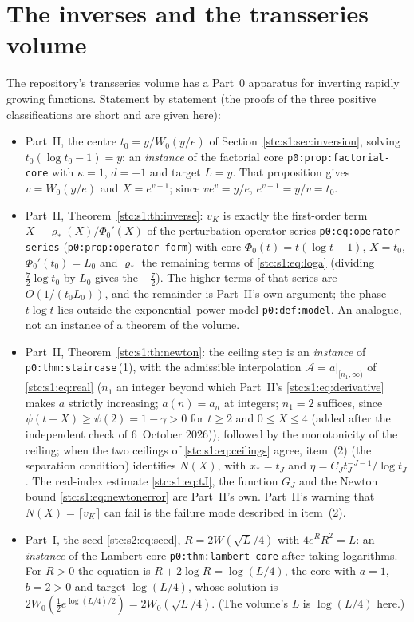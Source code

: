 \documentclass[11pt,letterpaper]{article}
\numberwithin{equation}{section}
\theoremstyle{remark}\newtheorem{remark}[theorem]{Remark}
\newcommand{\file}[1]{\nolinkurl{#1}}
\begin{document}
\section*{The inverses and the transseries volume}\label{stc:sec:inverses}
The repository's transseries volume \cite{TSvol} has a Part~0 apparatus for inverting rapidly growing functions. Statement by statement (the proofs of the three positive classifications are short and are given here):
\begin{itemize}
\item Part~II, the centre $t_0=y/W_0(y/e)$ of Section~\ref{stc:s1:sec:inversion}, solving $t_0(\log t_0-1)=y$: an \emph{instance} of the factorial core \file{p0:prop:factorial-core} with $\kappa=1$, $d=-1$ and target $L=y$. That proposition gives $v=W_0(y/e)$ and $X=e^{v+1}$; since $ve^v=y/e$, $e^{v+1}=y/v=t_0$.
\item Part~II, Theorem~\ref{stc:s1:th:inverse}: $v_K$ is exactly the first-order term $X-\varrho_*(X)/\Phi_0'(X)$ of the perturbation-operator series \file{p0:eq:operator-series} (\file{p0:prop:operator-form}) with core $\Phi_0(t)=t(\log t-1)$, $X=t_0$, $\Phi_0'(t_0)=L_0$ and $\varrho_*$ the remaining terms of \eqref{stc:s1:eq:loga} (dividing $\frac72\log t_0$ by $L_0$ gives the $-\frac72$). The higher terms of that series are $O(1/(t_0L_0))$, and the remainder is Part~II's own argument; the phase $t\log t$ lies outside the exponential--power model \file{p0:def:model}. An analogue, not an instance of a theorem of the volume.
\item Part~II, Theorem~\ref{stc:s1:th:newton}: the ceiling step is an \emph{instance} of \file{p0:thm:staircase}\,(1), with the admissible interpolation $\mathcal A=a|_{[n_1,\infty)}$ of \eqref{stc:s1:eq:real} ($n_1$ an integer beyond which Part~II's \eqref{stc:s1:eq:derivative} makes $a$ strictly increasing; $a(n)=a_n$ at integers; $n_1=2$ suffices, since $\psi(t+X)\ge\psi(2)=1-\gamma>0$ for $t\ge2$ and $0\le X\le4$ \textup{(added after the independent check of 6~October 2026)}), followed by the monotonicity of the ceiling; when the two ceilings of \eqref{stc:s1:eq:ceilings} agree, item~(2) (the separation condition) identifies $N(X)$, with $x_\ast=t_J$ and $\eta=C_Jt_J^{-J-1}/\log t_J$. The real-index estimate \eqref{stc:s1:eq:tJ}, the function $G_J$ and the Newton bound \eqref{stc:s1:eq:newtonerror} are Part~II's own. Part~II's warning that $N(X)=\lceil v_K\rceil$ can fail is the failure mode described in item~(2).
\item Part~I, the seed \eqref{stc:s2:eq:seed}, $R=2W(\sqrt L/4)$ with $4e^RR^2=L$: an \emph{instance} of the Lambert core \file{p0:thm:lambert-core} after taking logarithms. For $R>0$ the equation is $R+2\log R=\log(L/4)$, the core with $a=1$, $b=2>0$ and target $\log(L/4)$, whose solution is $2W_0(\frac12e^{\log(L/4)/2})=2W_0(\sqrt L/4)$. (The volume's $L$ is $\log(L/4)$ here.)

\end{itemize}
\end{document}
